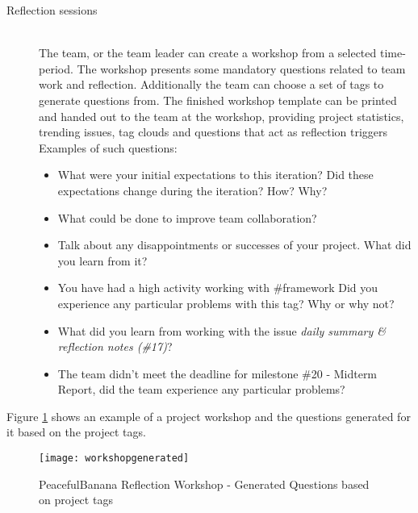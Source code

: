 \begin{description}
	\item[Reflection sessions] \hfill \\
	The team, or the team leader can create a workshop from a selected time-period. The workshop presents some mandatory questions
	related to team work and reflection. Additionally the team can choose a set of tags to generate questions from. The finished workshop template can be printed and handed out to the team at the workshop, providing project statistics, trending issues, tag clouds and questions that act as reflection triggers\\
	Examples of such questions: 
		\begin{itemize}
			\item What were your initial expectations to this iteration? Did these expectations change during the iteration? How? Why?
			\item What could be done to improve team collaboration?
			\item Talk about any disappointments or successes of your project. What did you learn from it?
			\item You have had a high activity working with \#framework Did you experience any particular problems with this tag? Why or why not?
			\item What did you learn from working with the issue \textit{daily summary \& reflection notes (\#17)}?
			\item The team didn't meet the deadline for milestone \#20 - Midterm Report, did the team experience any particular problems?
		\end{itemize}
\end{description}
Figure \ref{workshopquestionspeaceful} shows an example of a project workshop and the questions generated for it based on the project tags. 
	\begin{figure}[!htpb]
		\centering
		\texttt{[image: workshopgenerated]}
		\caption{PeacefulBanana Reflection Workshop - Generated Questions based on project tags}
		\label{workshopquestionspeaceful}
	\end{figure}